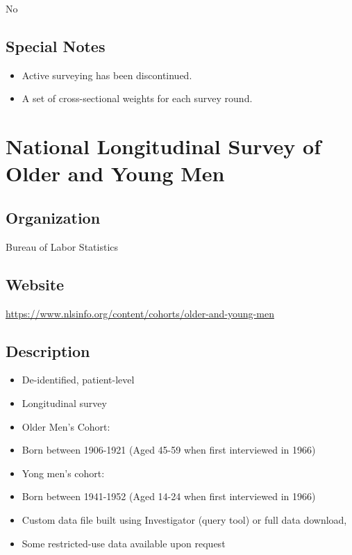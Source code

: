 \documentclass[
]{book}
\providecommand{\tightlist}{%
  \setlength{\itemsep}{0pt}\setlength{\parskip}{0pt}}
\begin{document}
No

\hypertarget{special-notes-56}{%
\section{Special Notes}\label{special-notes-56}}

\begin{itemize}
\tightlist
\item
  Active surveying has been discontinued.
\item
  A set of cross-sectional weights for each survey round.
\end{itemize}

\mainmatter

\hypertarget{national-longitudinal-survey-of-older-and-young-men}{%
\chapter{National Longitudinal Survey of Older and Young Men}\label{national-longitudinal-survey-of-older-and-young-men}}

\hypertarget{organization-57}{%
\section{Organization}\label{organization-57}}

Bureau of Labor Statistics

\hypertarget{website-57}{%
\section{Website}\label{website-57}}

\url{https://www.nlsinfo.org/content/cohorts/older-and-young-men}

\hypertarget{description-57}{%
\section{Description}\label{description-57}}

\begin{itemize}
\tightlist
\item
  De-identified, patient-level
\item
  Longitudinal survey
\item
  Older Men's Cohort:
\item
  Born between 1906-1921 (Aged 45-59 when first interviewed in 1966)
\item
  Yong men's cohort:
\item
  Born between 1941-1952 (Aged 14-24 when first interviewed in 1966)
\item
  Custom data file built using Investigator (query tool) or full data download,
\item
  Some restricted-use data available upon request
\end{itemize}
\end{document}
